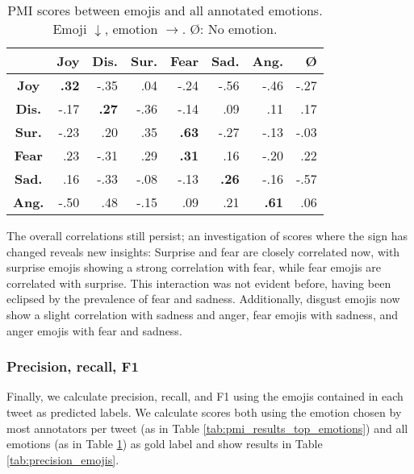 \documentclass[10pt, a4paper]{article}
\begin{document}
\begin{table}[!ht]
\centering
\begin{tabular}{c | r | r | r |%
%
%
 r | r | r | r}
 & \textbf{Joy} & \textbf{Dis.} & \textbf{Sur.} & \textbf{Fear} & \textbf{Sad.} & \textbf{Ang.} & \textbf{\O} \\\hline
\textbf{Joy} & \textbf{.32} & -.35 & .04 & -.24 & -.56 & -.46 & -.27 \\
\textbf{Dis.} & -.17 & \textbf{.27} & -.36 & -.14 & .09 & .11 & .17 \\
\textbf{Sur.} & -.23 & .20 & .35 & \textbf{.63} & -.27 & -.13 & -.03 \\
\textbf{Fear} & .23 & -.31 & .29 & \textbf{.31} & .16 & -.20 & .22 \\
\textbf{Sad.} & .16 & -.33 & -.08 & -.13 & \textbf{.26} & -.16 & -.57 \\
\textbf{Ang.} & -.50 & .48 & -.15 & .09 & .21 & \textbf{.61} & .06
\end{tabular}
\caption{PMI scores between emojis and all annotated emotions. Emoji $\downarrow$, emotion $\rightarrow$. \O: No emotion.}
\label{tab:pmi_results_all_emotions}
\end{table}

The overall correlations still persist; an investigation of scores where the sign has changed reveals new insights: Surprise and fear are closely correlated now, with surprise emojis showing a strong correlation with fear, while fear emojis are correlated with surprise. This interaction was not evident before, having been eclipsed by the prevalence of fear and sadness. Additionally, disgust emojis now show a slight correlation with sadness and anger, fear emojis with sadness, and anger emojis with fear and sadness.

\subsubsection{Precision, recall, F1}

Finally, we calculate precision, recall, and F1 using the emojis contained in each tweet as predicted labels. We calculate scores both using the emotion chosen by most annotators per tweet (as in Table \ref{tab:pmi_results_top_emotions}) and all emotions (as in Table \ref{tab:pmi_results_all_emotions}) as gold label and show results in Table \ref{tab:precision_emojis}.
\end{document}
